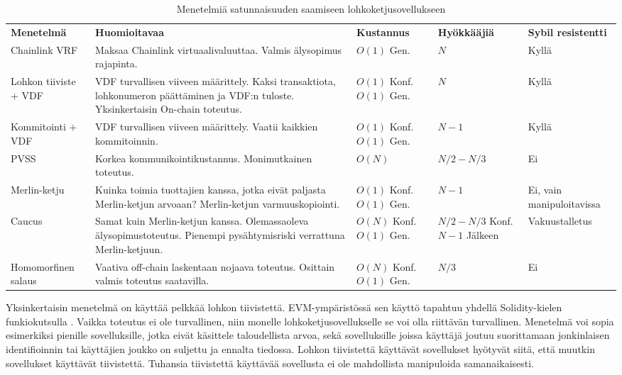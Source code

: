 \begin{table}[ht]
    \caption{Menetelmiä satunnaisuuden saamiseen lohkoketjusovellukseen}
    \label{table:results}
    \begin{tabular}{  l  p{4cm}  p{2.5cm} p{2cm} p{3.5cm}}
        \toprule

\textbf{Menetelmä}      
& \textbf{Huomioitavaa}
& \textbf{Kustannus}
& \textbf{Hyökkääjiä} 
& \textbf{Sybil resistentti} \\
Chainlink VRF 
& Maksaa Chainlink virtuaalivaluuttaa. Valmis älysopimus rajapinta.
& $O(1)$ Gen.
& $N$
& Kyllä  \\\hline
Lohkon tiiviste + VDF 
& VDF turvallisen viiveen määrittely. Kaksi transaktiota, lohkonumeron päättäminen ja VDF:n tuloste. Yksinkertaisin On-chain toteutus.
& $O(1)$ Konf. $O(1)$ Gen.
& $N$
& Kyllä  \\\hline
Kommitointi + VDF       
& VDF turvallisen viiveen määrittely. Vaatii kaikkien kommitoinnin.                   
&  $O(1)$ Konf. $O(1)$ Gen.
& $N-1$  
& Kyllä  \\\hline
PVSS        
& Korkea kommunikointikustannus. Monimutkainen toteutus.
& $O(N)$
& $N/2 - N/3$  
& Ei \\\hline
Merlin-ketju
& Kuinka toimia tuottajien kanssa, jotka eivät paljasta Merlin-ketjun arvoaan? Merlin-ketjun varmuuskopiointi.
& $O(1)$ Konf. $O(1)$ Gen. 
& $N-1$ 
& Ei, vain manipuloitavissa  \\\hline
Caucus
& Samat kuin Merlin-ketjun kanssa. Olemassaoleva älysopimustoteutus. Pienempi pysähtymisriski verrattuna Merlin-ketjuun.
& $O(N)$ Konf. $O(1)$ Gen. 
& $N/2 - N/3$ Konf. $N-1$ Jälkeen 
& Vakuustalletus \\\hline
Homomorfinen salaus
& Vaativa off-chain laskentaan nojaava toteutus. Osittain valmis toteutus saatavilla.
& $O(N)$ Konf. $O(1)$ Gen. 
& $N/3$
& Ei  \\

    \end{tabular}
\end{table}

Yksinkertaisin menetelmä on käyttää pelkkää lohkon tiivistettä. EVM-ympäristössä sen käyttö tapahtuu yhdellä Solidity-kielen funkiokutsulla \cite{noauthor_solidity_nodate}. Vaikka toteutus ei ole turvallinen, niin monelle lohkoketjusovellukselle se voi olla riittävän turvallinen. Menetelmä voi sopia esimerkiksi pienille sovelluksille, jotka eivät käsittele taloudellista arvoa, sekä sovelluksille joissa käyttäjä joutuu suorittamaan jonkinlaisen identifioinnin tai käyttäjien joukko on suljettu ja ennalta tiedossa. Lohkon tiivistettä käyttävät sovellukset hyötyvät siitä, että muutkin sovellukset käyttävät tiivistettä. Tuhansia tiivistettä käyttävää sovellusta ei ole mahdollista manipuloida samanaikaisesti.


